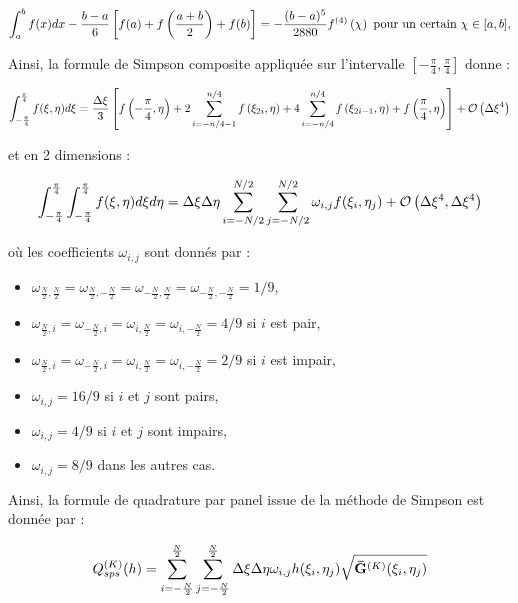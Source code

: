 \begin{equation}
\displaystyle\int_a^b f(x)dx - \dfrac{b-a}{6} \left[ f(a)+f\left(\dfrac{a+b}{2}\right) + f(b) \right] = - \dfrac{(b-a)^5}{2880}f^{(4)}\left( \chi \right) \text{ pour un certain } \chi \in [a,b],
\end{equation}

Ainsi, la formule de Simpson composite appliquée sur l'intervalle $\left[ - \frac{\pi}{4}, \frac{\pi}{4} \right]$ donne :

\begin{equation}
\displaystyle\int_{-\frac{\pi}{4}}^{\frac{\pi}{4}} f(\xi, \eta) d\xi = \dfrac{\Delta \xi}{3} \left[ f\left( - \dfrac{\pi}{4}, \eta \right) + 2 \displaystyle\sum\limits_{i=-n/4-1}^{n/4} f\left( \xi_{2i}, \eta \right) + 4\displaystyle\sum\limits_{i=-n/4}^{n/4} f\left( \xi_{2i-1}, \eta \right) + f \left( \dfrac{\pi}{4}, \eta \right) \right] + \mathcal{O}\left( \Delta \xi^4 \right)
\end{equation}

et en 2 dimensions :

\begin{equation}
\displaystyle\int_{-\frac{\pi}{4}}^{\frac{\pi}{4}} \displaystyle\int_{-\frac{\pi}{4}}^{\frac{\pi}{4}} f(\xi, \eta) d\xi  d\eta= \Delta\xi \Delta \eta \displaystyle\sum\limits_{i=-N/2}^{N/2}\displaystyle\sum\limits_{j=-N/2}^{N/2} \omega_{i,j} f(\xi_i, \eta_j) + \mathcal{O}\left( \Delta \xi^4, \Delta \xi^4 \right)
\label{eq:simpson 2d}
\end{equation}

où les coefficients $\omega_{i,j}$ sont donnés par :
\begin{itemize}
\item $\omega_{\frac{N}{2},\frac{N}{2}}=\omega_{\frac{N}{2},-\frac{N}{2}}=\omega_{-\frac{N}{2},\frac{N}{2}}=\omega_{-\frac{N}{2},-\frac{N}{2}}=1/9$,
\item $\omega_{\frac{N}{2},i}=\omega_{-\frac{N}{2},i}=\omega_{i,\frac{N}{2}}=\omega_{i,-\frac{N}{2}}=4/9$ si $i$ est pair,
\item $\omega_{\frac{N}{2},i}=\omega_{-\frac{N}{2},i}=\omega_{i,\frac{N}{2}}=\omega_{i,-\frac{N}{2}}=2/9$ si $i$ est impair,
\item $\omega_{i,j}=16/9$ si $i$ et $j$ sont pairs,
\item $\omega_{i,j}=4/9$ si $i$ et $j$ sont impairs,
\item $\omega_{i,j}=8/9$ dans les autres cas.
\end{itemize}


Ainsi, la formule de quadrature par panel issue de la méthode de Simpson est donnée par :

\begin{equation}
Q_{sps}^{(K)}(h)=\displaystyle\sum\limits_{i = -\frac{N}{2}}^{\frac{N}{2}}\displaystyle\sum\limits_{j = -\frac{N}{2}}^{\frac{N}{2}} \Delta \xi \Delta \eta \omega_{i,j} h(\xi_i, \eta_j) \sqrt{\mathbf{\bar{G}}^{(K)}(\xi_i, \eta_j)}
\label{eq:simpson par panel}
\end{equation}

